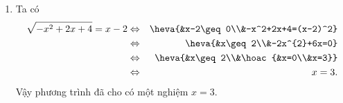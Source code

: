 \begin{bt}
{\begin{enumerate}
			Vậy phương trình đã cho có một nghiệm $x=\dfrac{7}{2}$.
			\item Ta có \begin{eqnarray*}
				\sqrt{-x^{2}+2 x+4}=x-2&\Leftrightarrow&\heva{&x-2\geq 0\\&-x^2+2x+4=(x-2)^2}\\
				&\Leftrightarrow&\heva{&x\geq 2\\&-2x^{2}+6x=0}\\
				&\Leftrightarrow&\heva{&x\geq 2\\&\hoac{&x=0\\&x=3}}\\
				&\Leftrightarrow& x=3.
			\end{eqnarray*}
			Vậy phương trình đã cho có một nghiệm $x=3$.
			
			
		\end{enumerate}
	}
\end{bt}

